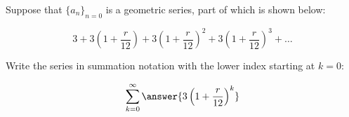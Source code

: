 \documentclass{ximera}
\author{Jim Talamo}
\begin{document}
\begin{exercise}
Suppose that $\{a_n\}_{n=0}$ is a geometric series, part of which is shown below:

\[
3+3\left(1+\frac{r}{12}\right)+ 3\left(1+\frac{r}{12}\right)^2+3\left(1+\frac{r}{12}\right)^3 + \ldots
\]

Write the series in summation notation with the lower index starting at $k=0$:

\[
\sum_{k=0}^{\infty} \answer{3\left(1+\frac{r}{12}\right)^k}
\]


\end{exercise}
\end{document}
